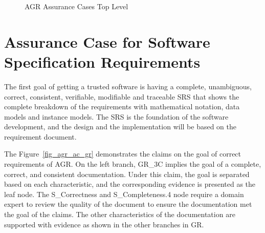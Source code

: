 \begin{figure}[hp]
    \centering
    \caption[AGR Assurance Cases Top Level]{AGR Assurance Cases Top Level}
    \label{fig_agr_ac_top}
\end{figure}


\section{Assurance Case for Software Specification Requirements}

The first goal of getting a trusted software is having a complete, unambiguous, correct, consistent, verifiable, modifiable and traceable SRS that shows the complete breakdown of the requirements with mathematical notation, data models and instance models. The SRS is the foundation of the software development, and the design and the implementation will be based on the requirement document.

The Figure~\ref{fig_agr_ac_gr} demonstrates the claims on the goal of correct requirements of AGR. On the left branch, GR\_3C implies the goal of a complete, correct, and consistent documentation. Under this claim, the goal is separated based on each characteristic, and the corresponding evidence is presented as the leaf node. The S\_Correctness and S\_Completeness.4 node require a domain expert to review the quality of the document to ensure the documentation met the goal of the claims. The other characteristics of the documentation are supported with evidence as shown in the other branches in GR.

